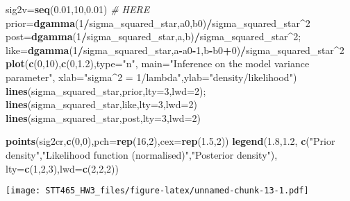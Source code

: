 \documentclass[]{article}
\newenvironment{Shaded}{\begin{snugshade}}{\end{snugshade}}
\newcommand{\KeywordTok}[1]{\textcolor[rgb]{0.13,0.29,0.53}{\textbf{#1}}}
\newcommand{\DataTypeTok}[1]{\textcolor[rgb]{0.13,0.29,0.53}{#1}}
\newcommand{\DecValTok}[1]{\textcolor[rgb]{0.00,0.00,0.81}{#1}}
\newcommand{\FloatTok}[1]{\textcolor[rgb]{0.00,0.00,0.81}{#1}}
\newcommand{\StringTok}[1]{\textcolor[rgb]{0.31,0.60,0.02}{#1}}
\newcommand{\CommentTok}[1]{\textcolor[rgb]{0.56,0.35,0.01}{\textit{#1}}}
\newcommand{\OperatorTok}[1]{\textcolor[rgb]{0.81,0.36,0.00}{\textbf{#1}}}
\newcommand{\NormalTok}[1]{#1}
\begin{document}
\begin{Shaded}
\begin{Highlighting}[]
\NormalTok{sig2v=}\KeywordTok{seq}\NormalTok{(}\FloatTok{0.01}\NormalTok{,}\DecValTok{10}\NormalTok{,}\FloatTok{0.01}\NormalTok{) }\CommentTok{# HERE }
\NormalTok{prior=}\KeywordTok{dgamma}\NormalTok{(}\DecValTok{1}\OperatorTok{/}\NormalTok{sigma_squared_star,a0,b0)}\OperatorTok{/}\NormalTok{sigma_squared_star}\OperatorTok{^}\DecValTok{2}
\NormalTok{post=}\KeywordTok{dgamma}\NormalTok{(}\DecValTok{1}\OperatorTok{/}\NormalTok{sigma_squared_star,a,b)}\OperatorTok{/}\NormalTok{sigma_squared_star}\OperatorTok{^}\DecValTok{2}\NormalTok{;}
\NormalTok{like=}\KeywordTok{dgamma}\NormalTok{(}\DecValTok{1}\OperatorTok{/}\NormalTok{sigma_squared_star,a}\OperatorTok{-}\NormalTok{a0}\OperatorTok{-}\DecValTok{1}\NormalTok{,b}\OperatorTok{-}\NormalTok{b0}\OperatorTok{+}\DecValTok{0}\NormalTok{)}\OperatorTok{/}\NormalTok{sigma_squared_star}\OperatorTok{^}\DecValTok{2}
\KeywordTok{plot}\NormalTok{(}\KeywordTok{c}\NormalTok{(}\DecValTok{0}\NormalTok{,}\DecValTok{10}\NormalTok{),}\KeywordTok{c}\NormalTok{(}\DecValTok{0}\NormalTok{,}\FloatTok{1.2}\NormalTok{),}\DataTypeTok{type=}\StringTok{"n"}\NormalTok{,}
     \DataTypeTok{main=}\StringTok{"Inference on the model variance parameter"}\NormalTok{,}
     \DataTypeTok{xlab=}\StringTok{"sigma^2 = 1/lambda"}\NormalTok{,}\DataTypeTok{ylab=}\StringTok{"density/likelihood"}\NormalTok{)}
\KeywordTok{lines}\NormalTok{(sigma_squared_star,prior,}\DataTypeTok{lty=}\DecValTok{3}\NormalTok{,}\DataTypeTok{lwd=}\DecValTok{2}\NormalTok{); }\KeywordTok{lines}\NormalTok{(sigma_squared_star,like,}\DataTypeTok{lty=}\DecValTok{3}\NormalTok{,}\DataTypeTok{lwd=}\DecValTok{2}\NormalTok{)}
\KeywordTok{lines}\NormalTok{(sigma_squared_star,post,}\DataTypeTok{lty=}\DecValTok{3}\NormalTok{,}\DataTypeTok{lwd=}\DecValTok{2}\NormalTok{)}

\KeywordTok{points}\NormalTok{(sig2cr,}\KeywordTok{c}\NormalTok{(}\DecValTok{0}\NormalTok{,}\DecValTok{0}\NormalTok{),}\DataTypeTok{pch=}\KeywordTok{rep}\NormalTok{(}\DecValTok{16}\NormalTok{,}\DecValTok{2}\NormalTok{),}\DataTypeTok{cex=}\KeywordTok{rep}\NormalTok{(}\FloatTok{1.5}\NormalTok{,}\DecValTok{2}\NormalTok{))}
\KeywordTok{legend}\NormalTok{(}\FloatTok{1.8}\NormalTok{,}\FloatTok{1.2}\NormalTok{,}
       \KeywordTok{c}\NormalTok{(}\StringTok{"Prior density"}\NormalTok{,}\StringTok{"Likelihood function (normalised)"}\NormalTok{,}\StringTok{"Posterior density"}\NormalTok{),}
       \DataTypeTok{lty=}\KeywordTok{c}\NormalTok{(}\DecValTok{1}\NormalTok{,}\DecValTok{2}\NormalTok{,}\DecValTok{3}\NormalTok{),}\DataTypeTok{lwd=}\KeywordTok{c}\NormalTok{(}\DecValTok{2}\NormalTok{,}\DecValTok{2}\NormalTok{,}\DecValTok{2}\NormalTok{))}
\end{Highlighting}
\end{Shaded}

\texttt{[image: STT465\_HW3\_files/figure-latex/unnamed-chunk-13-1.pdf]}
\end{document}
